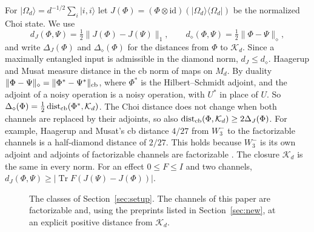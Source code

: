 \documentclass[11pt]{article}
\newcommand{\Tr}{\operatorname{Tr}}
\newcommand{\Fact}{\operatorname{Fact}}
\newcommand{\K}{\mathcal K}
\newcommand{\N}{\mathcal N}
\newcommand{\ket}[1]{\lvert #1\rangle}
\newcommand{\bra}[1]{\langle #1\rvert}
\begin{document}
For $\ket{\Omega_d}=d^{-1/2}\sum_i\ket{i,i}$ let $J(\Phi)=(\Phi\otimes\mathrm{id})(\ket{\Omega_d}\!\bra{\Omega_d})$ be the normalized Choi state.  We use
\[
 d_J(\Phi,\Psi)=\tfrac12\|J(\Phi)-J(\Psi)\|_1,\qquad d_\diamond(\Phi,\Psi)=\tfrac12\|\Phi-\Psi\|_\diamond,
\]
and write $\Delta_J(\Phi)$ and $\Delta_\diamond(\Phi)$ for the distances from $\Phi$ to $\K_d$.  Since a maximally entangled input is admissible in the diamond norm, $d_J\le d_\diamond$.  Haagerup and Musat measure distance in the cb norm of maps on $M_d$.  By duality $\|\Phi-\Psi\|_\diamond=\|\Phi^*-\Psi^*\|_{\rm cb}$, where $\Phi^*$ is the Hilbert--Schmidt adjoint, and the adjoint of a noisy operation is a noisy operation, with $U^*$ in place of $U$.  So $\Delta_\diamond(\Phi)=\tfrac12\,\mathrm{dist}_{\rm cb}(\Phi^*,\K_d)$.  The Choi distance does not change when both channels are replaced by their adjoints, so also $\mathrm{dist}_{\rm cb}(\Phi,\K_d)\ge2\Delta_J(\Phi)$.  For example, Haagerup and Musat's cb distance $4/27$ from $W_3^-$ to the factorizable channels is a half-diamond distance of $2/27$.  This holds because $W_3^-$ is its own adjoint and adjoints of factorizable channels are factorizable \cite[Remark~1.4(b)]{HaagerupMusat11}.  The closure $\K_d$ is the same in every norm.  For an effect $0\le F\le I$ and two channels, $d_J(\Phi,\Psi)\ge|\Tr F(J(\Psi)-J(\Phi))|$.

\begin{figure}[t]
\centering
{}
\caption{The classes of Section~\ref{sec:setup}.  The channels of this paper are factorizable and, using the preprints listed in Section~\ref{sec:new}, at an explicit positive distance from $\K_d$.}
\label{fig:classes}
\end{figure}
\end{document}

